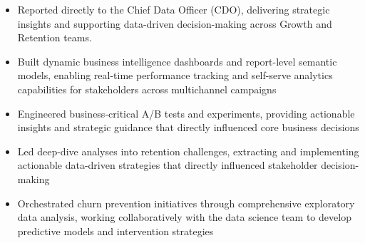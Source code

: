 \documentclass[10pt,a4paper,ragged2e,withhyper]{altacv}
\begin{document}
\vspace{1em}  %


\begin{paracol}{2}


\begin{itemize}
\item Reported directly to the Chief Data Officer (CDO), delivering strategic insights and supporting data-driven decision-making across Growth and Retention teams.
\item Built dynamic business intelligence dashboards and report-level semantic models, enabling real-time performance tracking and self-serve analytics capabilities for stakeholders across multichannel campaigns
\item Engineered business-critical A/B tests and experiments, providing actionable insights and strategic guidance that directly influenced core business decisions
\item Led deep-dive analyses into retention challenges, extracting and implementing actionable data-driven strategies that directly influenced stakeholder decision-making
\item Orchestrated churn prevention initiatives through comprehensive exploratory data analysis, working collaboratively with the data science team to develop predictive models and intervention strategies
\end{itemize}


\end{paracol}
\end{document}
